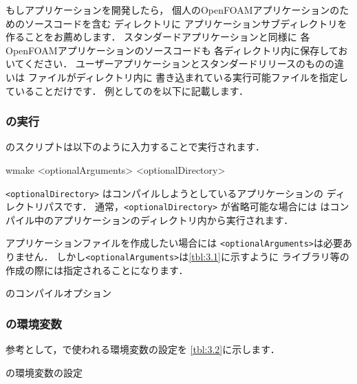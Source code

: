 もしアプリケーションを開発したら，
個人のOpenFOAMアプリケーションのためのソースコードを含む
ディレクトリに
アプリケーションサブディレクトリを作ることをお薦めします．
スタンダードアプリケーションと同様に
各OpenFOAMアプリケーションのソースコードも
各ディレクトリ内に保存しておいてください．
ユーザーアプリケーションとスタンダードリリースのものの違いは
ファイルがディレクトリ内に
書き込まれている実行可能ファイルを指定していることだけです．
例としてのを以下に記載します．

\subsubsection{の実行}
\label{sssec:3.2.2.4}
のスクリプトは以下のように入力することで実行されます．
\begin{OFverbatim}[terminal]
wmake <optionalArguments> <optionalDirectory>
\end{OFverbatim}
\verb|<optionalDirectory>| はコンパイルしようとしているアプリケーションの
ディレクトリパスです．
通常，\verb|<optionalDirectory>| が省略可能な場合には
はコンパイル中のアプリケーションのディレクトリ内から実行されます．


アプリケーションファイルを作成したい場合には
\verb|<optionalArguments>|は必要ありません．
しかし\verb|<optionalArguments>|は\autoref{tbl:3.1}に示すように
ライブラリ等の作成の際には指定されることになります．


\begin{table}[ht]
 
 \caption{のコンパイルオプション}
 \label{tbl:3.1}
\end{table}


\subsubsection{の環境変数}
\label{sssec:3.2.2.5}
参考として，で使われる環境変数の設定を
\autoref{tbl:3.2}に示します．


\begin{table}[ht]
 
 \caption{の環境変数の設定}
 \label{tbl:3.2}
\end{table}


